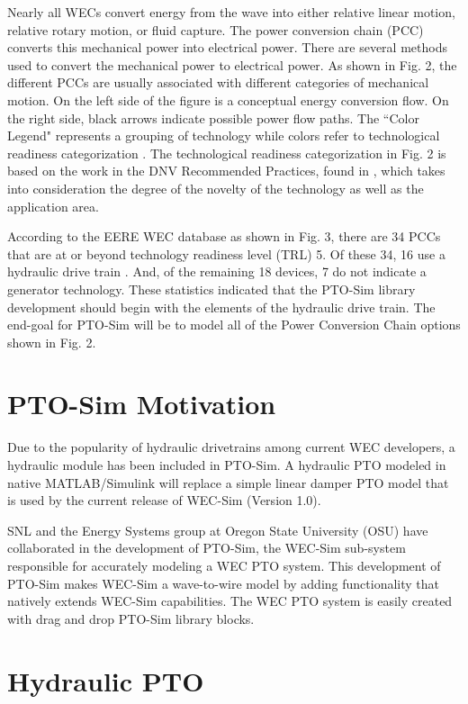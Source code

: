 \documentclass[conference]{IEEEtran}
\begin{document}
Nearly all WECs convert energy from the wave into either relative linear motion, relative rotary motion, or fluid capture. The power conversion chain (PCC) converts this mechanical power into electrical power.  There are several methods used to convert the mechanical power to electrical power. As shown in Fig. 2, the different PCCs are usually associated with different categories of mechanical motion. On the left side of the figure is a conceptual energy conversion flow. On the right side, black arrows indicate possible power flow paths. The ``Color Legend" represents a grouping of technology while colors refer to technological readiness categorization \cite{reed2010accelerating}\cite{ruehl2012wave}. The technological readiness categorization in Fig. 2 is based on the work in the DNV Recommended Practices, found in \cite{veritas2001recommended}, which takes into consideration the degree of the novelty of the technology as well as the application area. 

According to the EERE WEC database as shown in Fig. 3, there are 34 PCCs that are at or beyond technology readiness level (TRL) 5. Of these 34, 16 use a hydraulic drive train \cite{eere}. And, of the remaining 18 devices, 7 do not indicate a generator technology. These statistics indicated that the PTO-Sim library development should begin with the elements of the hydraulic drive train.  The end-goal for PTO-Sim will be to model all of the Power Conversion Chain options shown in Fig. 2.


    
\section{PTO-Sim Motivation}
Due to the popularity of hydraulic drivetrains among current WEC developers, a hydraulic module has been included in PTO-Sim. A hydraulic PTO modeled in native MATLAB/Simulink will replace a simple linear damper PTO model that is used by the current release of WEC-Sim (Version 1.0).

SNL and the Energy Systems group at Oregon State University (OSU) have collaborated in the development of PTO-Sim, the WEC-Sim sub-system responsible for accurately modeling a WEC PTO system. This development of PTO-Sim makes WEC-Sim a wave-to-wire model by adding functionality that natively extends WEC-Sim capabilities. The WEC PTO system is easily created with drag and drop PTO-Sim library blocks. 

\section{Hydraulic PTO}
\end{document}
